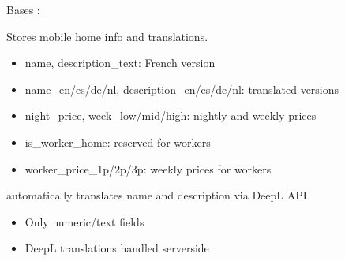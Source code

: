 \documentclass[letterpaper,10pt,french]{sphinxmanual}
\begin{document}
\begin{fulllineitems}
\label{\detokenize{index:bookings.models.MobileHome}}
\pysigstartsignatures
\pysiglinewithargsret
{}
{\sphinxparamcomma {}}
{}
\pysigstopsignatures
\sphinxAtStartPar
Bases : 

\sphinxAtStartPar
Stores mobile home info and translations.
\begin{description}
\begin{itemize}
\item {} 
\sphinxAtStartPar
name, description\_text: French version

\item {} 
\sphinxAtStartPar
name\_en/es/de/nl, description\_en/es/de/nl: translated versions

\item {} 
\sphinxAtStartPar
night\_price, week\_low/mid/high: nightly and weekly prices

\item {} 
\sphinxAtStartPar
is\_worker\_home: reserved for workers

\item {} 
\sphinxAtStartPar
worker\_price\_1p/2p/3p: weekly prices for workers

\end{itemize}

\end{description}


\begin{fulllineitems}

\pysigstartsignatures
\pysigline
{}
\pysigstopsignatures
\sphinxAtStartPar
automatically translates name and description via DeepL API

\end{fulllineitems}

\begin{description}
\begin{itemize}
\item {} 
\sphinxAtStartPar
Only numeric/text fields

\item {} 
\sphinxAtStartPar
DeepL translations handled server\sphinxhyphen{}side


\end{itemize}
\end{description}
\end{fulllineitems}
\end{document}
